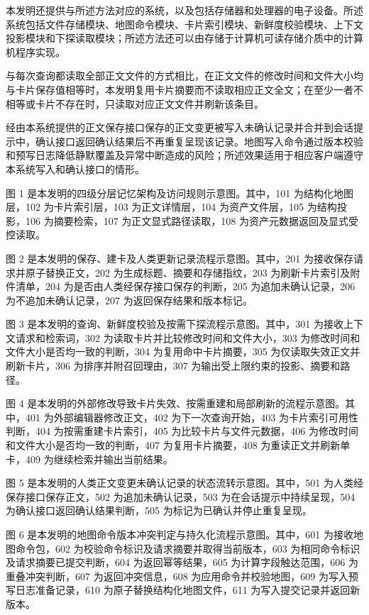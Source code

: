  本发明还提供与所述方法对应的系统，以及包括存储器和处理器的电子设备。所述系统包括文件存储模块、地图命令模块、卡片索引模块、新鲜度校验模块、上下文投影模块和下探读取模块；所述方法还可以由存储于计算机可读存储介质中的计算机程序实现。

 与每次查询都读取全部正文文件的方式相比，在正文文件的修改时间和文件大小均与卡片保存值相等时，本发明复用卡片摘要而不读取相应正文全文；在至少一者不相等或卡片不存在时，只读取对应正文文件并刷新该条目。

 经由本系统提供的正文保存接口保存的正文变更被写入未确认记录并合并到会话提示中，确认接口返回确认结果后不再重复呈现该记录。地图写入命令通过版本校验和预写日志降低静默覆盖及异常中断造成的风险；所述效果适用于相应客户端遵守本系统写入和确认接口的情形。

 图 1 是本发明的四级分层记忆架构及访问规则示意图。其中，101 为结构化地图层，102 为卡片索引层，103 为正文详情层，104 为资产文件层，105 为结构投影，106 为摘要检索，107 为正文显式路径读取，108 为资产元数据返回及显式受控读取。

 图 2 是本发明的保存、建卡及人类更新记录流程示意图。其中，201 为接收保存请求并原子替换正文，202 为生成标题、摘要和存储指纹，203 为刷新卡片索引及附件清单，204 为是否由人类经保存接口保存的判断，205 为追加未确认记录，206 为不追加未确认记录，207 为返回保存结果和版本标记。

 图 3 是本发明的查询、新鲜度校验及按需下探流程示意图。其中，301 为接收上下文请求和检索词，302 为读取卡片并比较修改时间和文件大小，303 为修改时间和文件大小是否均一致的判断，304 为复用命中卡片摘要，305 为仅读取失效正文并刷新卡片，306 为排序并附召回理由，307 为输出受上限约束的投影、摘要和路径。

 图 4 是本发明的外部修改导致卡片失效、按需重建和局部刷新的流程示意图。其中，401 为外部编辑器修改正文，402 为下一次查询开始，403 为卡片索引可用性判断，404 为按需重建卡片索引，405 为比较卡片与文件元数据，406 为修改时间和文件大小是否均一致的判断，407 为复用卡片摘要，408 为重读正文并刷新单卡，409 为继续检索并输出当前结果。

 图 5 是本发明的人类正文变更未确认记录的状态流转示意图。其中，501 为人类经保存接口保存正文，502 为追加未确认记录，503 为在会话提示中持续呈现，504 为确认接口返回确认结果判断，505 为标记为已确认并停止重复呈现。

 图 6 是本发明的地图命令版本冲突判定与持久化流程示意图。其中，601 为接收地图命令包，602 为校验命令标识及请求摘要并取得当前版本，603 为相同命令标识及请求摘要已提交判断，604 为返回幂等结果，605 为计算字段触达范围，606 为重叠冲突判断，607 为返回冲突信息，608 为应用命令并校验地图，609 为写入预写日志准备记录，610 为原子替换结构化地图文件，611 为写入提交记录并返回新版本。

